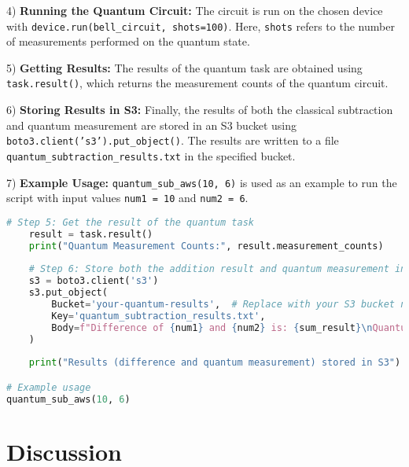 \documentclass[conference]{IEEEtran}
\begin{document}
    \item 4) \textbf{Running the Quantum Circuit:} The circuit is run on the chosen device with \texttt{device.run(bell\_circuit, shots=100)}. Here, \texttt{shots} refers to the number of measurements performed on the quantum state.
    
    \item 5) \textbf{Getting Results:} The results of the quantum task are obtained using \texttt{task.result()}, which returns the measurement counts of the quantum circuit.
    
    \item 6) \textbf{Storing Results in S3:} Finally, the results of both the classical subtraction and quantum measurement are stored in an S3 bucket using \texttt{boto3.client('s3').put\_object()}. The results are written to a file \texttt{quantum\_subtraction\_results.txt} in the specified bucket.
    
    \item 7) \textbf{Example Usage:} \texttt{quantum\_sub\_aws(10, 6)} is used as an example to run the script with input values \texttt{num1 = 10} and \texttt{num2 = 6}.

    
\begin{tcolorbox}[title=aws\_quantum\_subtraction.py Script, colback=gray!5!white, colframe=blue!75!black]
\begin{lstlisting}[language=Python]
    # Step 5: Get the result of the quantum task
    result = task.result()
    print("Quantum Measurement Counts:", result.measurement_counts)
    
    # Step 6: Store both the addition result and quantum measurement in S3
    s3 = boto3.client('s3')
    s3.put_object(
        Bucket='your-quantum-results',  # Replace with your S3 bucket name
        Key='quantum_subtraction_results.txt',
        Body=f"Difference of {num1} and {num2} is: {sum_result}\nQuantum Measurement: {result.measurement_counts}\nExecution Finished\nProcess Completed"
    )
    
    print("Results (difference and quantum measurement) stored in S3")

# Example usage
quantum_sub_aws(10, 6)
\end{lstlisting}
\end{tcolorbox}




\section{Discussion}
\end{document}
